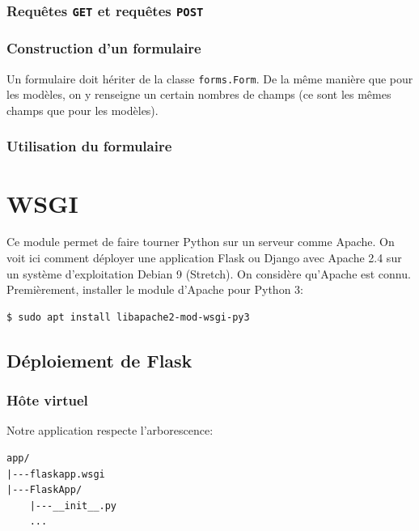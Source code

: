 \documentclass[a4paper, 10pt]{article}
\begin{document}
\subsubsection[Requêtes {\footnotesize\texttt{GET}} et requêtes {\footnotesize\texttt{POST}}]{Requêtes {\normalfont\bfseries\texttt{GET}} et requêtes {\normalfont\bfseries\texttt{POST}}}

\subsubsection{Construction d'un formulaire}

Un formulaire doit hériter de la classe \texttt{forms.Form}. De la même manière que pour
les modèles, on y renseigne un certain nombres de champs (ce sont les mêmes champs que pour les modèles).

\subsubsection{Utilisation du formulaire}

\section{WSGI}
Ce module permet de faire tourner Python sur un serveur comme Apache. On voit ici comment déployer une application Flask ou Django avec Apache 2.4 sur un système d'exploitation Debian 9 (Stretch). On considère qu'Apache est connu. Premièrement, installer le module d'Apache pour Python 3:

\begin{verbatim}
$ sudo apt install libapache2-mod-wsgi-py3
\end{verbatim}

\subsection{Déploiement de Flask}
\subsubsection{Hôte virtuel}

Notre application respecte l'arborescence:
\begin{verbatim}
app/
|---flaskapp.wsgi
|---FlaskApp/
    |---__init__.py
    ...
\end{verbatim}
\end{document}

